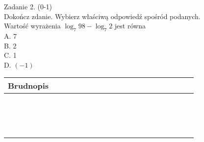 \documentclass[10pt]{article}
\begin{document}
Zadanie 2. (0-1)\\
Dokończ zdanie. Wybierz właściwą odpowiedź spośród podanych.\\
Wartość wyrażenia \(\log _{7} 98-\log _{7} 2\) jest równa\\
A. 7\\
B. 2\\
C. 1\\
D. \((-1)\)

\begin{center}
\begin{tabular}{|c|c|c|c|c|c|c|c|c|c|c|c|c|c|c|c|c|c|c|c|c|c|c|}
\hline
\multicolumn{5}{|l|}{Brudnopis} &  &  &  &  &  &  &  &  &  &  &  &  &  &  &  &  &  &  \\
\hline
 &  &  &  &  &  &  &  &  &  &  &  &  &  &  &  &  &  &  &  &  &  &  \\
\hline
 &  &  &  &  &  &  &  &  &  &  &  &  &  &  &  &  &  &  &  &  &  &  \\
\hline
 &  &  &  &  &  &  &  &  &  &  &  &  &  &  &  &  &  &  &  &  &  &  \\
\hline
 &  &  &  &  &  &  &  &  &  &  &  &  &  &  &  &  &  &  &  &  &  &  \\
\hline
 &  &  &  &  &  &  &  &  &  &  &  &  &  &  &  &  &  &  &  &  &  &  \\
\hline
 &  &  &  &  &  &  &  &  &  &  &  &  &  &  &  &  &  &  &  &  &  &  \\
\hline
 &  &  &  &  &  &  &  &  &  &  &  &  &  &  &  &  &  &  &  &  &  &  \\
\hline
 &  &  &  &  &  &  &  &  &  &  &  &  &  &  &  &  &  &  &  &  &  &  \\
\hline
 &  &  &  &  &  &  &  &  &  &  &  &  &  &  &  &  &  &  &  &  &  &  \\
\hline
 &  &  &  &  &  &  &  &  &  &  &  &  &  &  &  &  &  &  &  &  &  &  \\
\hline
 &  &  &  &  &  &  &  &  &  &  &  &  &  &  &  &  &  &  &  &  &  &  \\
\hline
 &  &  &  &  &  &  &  &  &  &  &  &  &  &  &  &  &  &  &  &  &  &  \\
\hline
 &  &  &  &  &  &  &  &  &  &  &  &  &  &  &  &  &  &  &  &  &  &  \\
\hline
 &  &  &  &  &  &  &  &  &  &  &  &  &  &  &  &  &  &  &  &  &  &  \\
\hline
 &  &  &  &  &  &  &  &  &  &  &  &  &  &  &  &  &  &  &  &  &  &  \\
\hline
\end{tabular}
\end{center}
\end{document}
